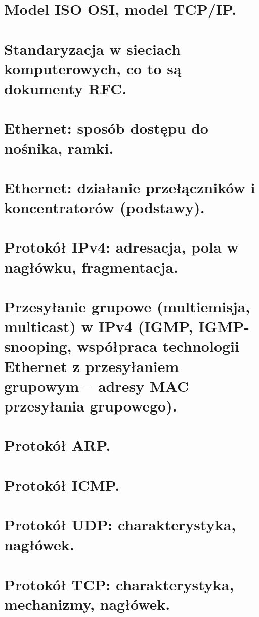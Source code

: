 \documentclass[../sk-egzamin.tex]{subfiles}
\begin{document}
\section{
Model ISO OSI, model TCP/IP.
}

\section{
Standaryzacja w sieciach komputerowych, co to są dokumenty RFC.
}

\section{
Ethernet: sposób dostępu do nośnika, ramki.
}

\section{
Ethernet: działanie przełączników i koncentratorów (podstawy).
}

\section{
Protokół IPv4: adresacja, pola w nagłówku, fragmentacja.
}

\section{
Przesyłanie grupowe (multiemisja, multicast) w IPv4 (IGMP, IGMP-snooping,
współpraca technologii Ethernet z przesyłaniem grupowym – adresy MAC przesyłania grupowego).
}

\section{
Protokół ARP.
}

\section{
Protokół ICMP.
}

\section{
Protokół UDP: charakterystyka, nagłówek.
}

\section{
Protokół TCP: charakterystyka, mechanizmy, nagłówek.
}
\end{document}
